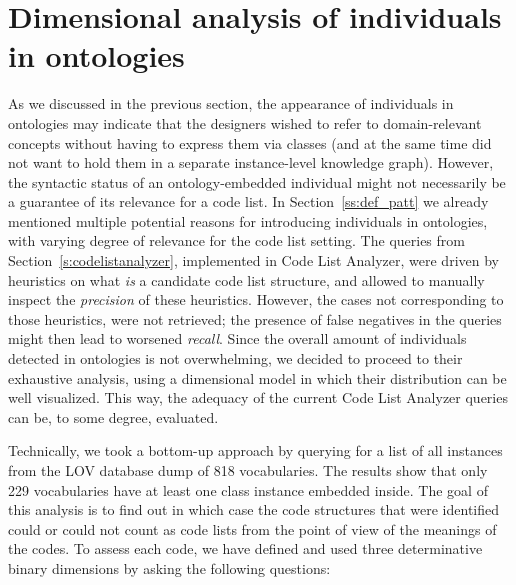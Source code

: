 





\section{Dimensional analysis of individuals in ontologies}
\label{s:analysis_code_list_modeling_practice}

As we discussed in the previous section, the appearance of individuals in ontologies may indicate that the designers wished to refer to domain-relevant concepts without having to express them via classes (and at the same time did not want to hold them in a separate instance-level knowledge graph).
However, the syntactic status of an ontology-embedded individual might not necessarily be a guarantee of its relevance for a code list. 
In Section~\ref{ss:def_patt} we already mentioned multiple potential reasons for introducing individuals in ontologies, with varying degree of relevance for the code list setting.
The queries from Section~\ref{s:codelistanalyzer}, implemented in Code List Analyzer, were driven by heuristics on what \emph{is} a candidate code list structure, and allowed to manually inspect the \emph{precision} of these heuristics.
However, the cases not corresponding to those heuristics, were not retrieved; the presence of false negatives in the queries might then lead to worsened \emph{recall}. 
Since the overall amount of individuals detected in ontologies is not overwhelming, we decided to proceed to their exhaustive analysis, using a dimensional model in which their distribution can be well visualized.
This way, the adequacy of the current Code List Analyzer queries can be, to some degree, evaluated. 

Technically, we took a bottom-up approach by querying for a list of all instances from the LOV database dump of 818 vocabularies. The results show that only 229 
vocabularies have at least one class instance embedded inside. The goal of this analysis is to find out in which case the code structures that were identified could or could not count as code lists from the point of view of the meanings of the codes. To assess each code, we have defined and used three determinative binary dimensions by asking the following questions: %

